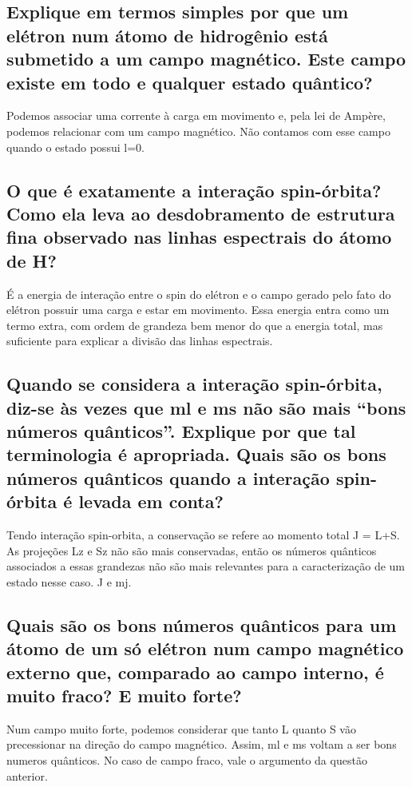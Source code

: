 \documentclass{article}
\begin{document}
\subsection{Explique em termos simples por que um elétron num átomo de hidrogênio está submetido a um campo magnético. Este campo existe em todo e qualquer estado quântico?}
Podemos associar uma corrente à carga em movimento e, pela lei de Ampère,  podemos relacionar com um campo magnético. Não contamos com esse campo quando o estado possui l=0.

\subsection{O que é exatamente a interação spin-órbita? Como ela leva ao desdobramento de estrutura fina observado nas linhas espectrais do átomo de H?}
É a energia de interação entre o spin do elétron e o campo gerado pelo fato do elétron possuir uma carga e estar em movimento. Essa energia entra como um termo extra, com ordem de grandeza bem menor do que a energia total, mas suficiente para explicar a divisão das linhas espectrais.

\subsection{Quando se considera a interação spin-órbita, diz-se às vezes que ml e ms não são mais “bons números quânticos”. Explique por que tal terminologia é apropriada. Quais são os bons números quânticos quando a interação spin-órbita é levada em conta?}

Tendo interação spin-orbita, a conservação se refere ao momento total J = L+S. As projeções Lz e Sz não são mais conservadas, então os números quânticos associados a essas grandezas não são mais relevantes para a caracterização de um estado nesse caso. J e mj.

\subsection{Quais são os bons números quânticos para um átomo de um só elétron num campo magnético externo que, comparado ao campo interno, é muito fraco? E muito forte?}

Num campo muito forte, podemos considerar que tanto L quanto S vão precessionar na direção do campo magnético. Assim, ml e ms voltam a ser bons numeros quânticos.
No caso de campo fraco, vale o argumento da questão anterior.
\end{document}
